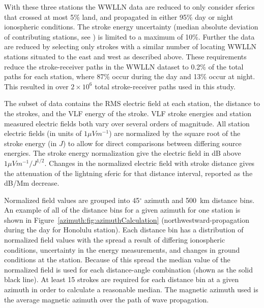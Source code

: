 With these three stations the WWLLN data are reduced to only consider sferics that crossed at most 5\% land, and propagated in either 95\% day or night ionospheric conditions.
The stroke energy uncertainty (median absolute deviation of contributing stations, see \citet{Hutchins2012}) is limited to a maximum of 10\%.
Further the data are reduced by selecting only strokes with a similar number of locating WWLLN stations situated to the east and west as described above.
These requirements reduce the stroke-receiver paths in the WWLLN dataset to 0.2\% of the total paths for each station, where 87\% occur during the day and 13\% occur at night.
This resulted in over $2\times10^6$ total stroke-receiver paths used in this study.

The subset of data contains the RMS electric field at each station, the distance to the strokes, and the VLF energy of the stroke.
VLF stroke energies and station measured electric fields both vary over several orders of magnitude.
All station electric fields (in units of $1 \mu V m^{-1}$) are normalized by the square root of the stroke energy (in $J$) to allow for direct comparisons between differing source energies.
The stroke energy normalization give the electric field in dB above $1 \mu Vm^{-1}/J^{1/2}$.
Changes in the normalized electric field with stroke distance gives the attenuation of the lightning sferic for that distance interval, reported as the dB/Mm decrease. 

Normalized field values are grouped into 45$^\circ$ azimuth and 500~km distance bins.
An example of all of the distance bins for a given azimuth for one station is shown in Figure~\ref{azimuth:fig:azimuthCalculation} (northwestward-propagation during the day for Honolulu station).
Each distance bin has a distribution of normalized field values with the spread a result of differing ionospheric conditions, uncertainty in the energy measurements, and changes in ground conditions at the station.
Because of this spread the median value of the normalized field is used for each distance-angle combination (shown as the solid black line).
At least 15 strokes are required for each distance bin at a given azimuth in order to calculate a reasonable median.
The magnetic azimuth used is the average magnetic azimuth over the path of wave propagation.

